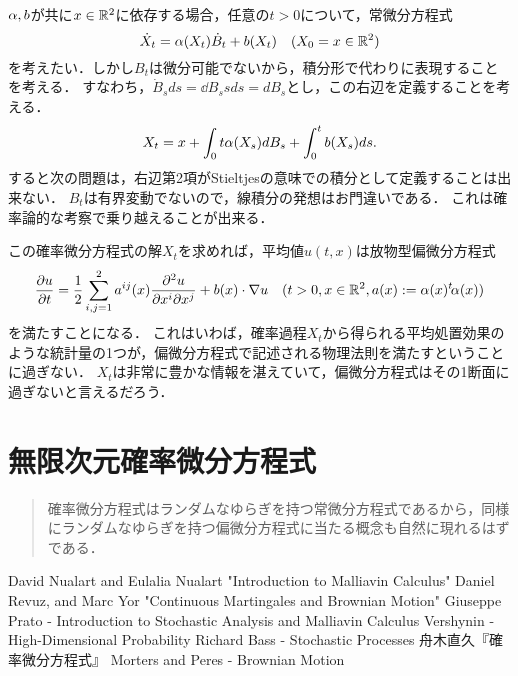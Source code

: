 \documentclass[uplatex,dvipdfmx]{jsreport}
\begin{document}
\begin{example}[変数係数の場合]
    $\alpha,b$が共に$x\in\mathbb{R}^2$に依存する場合，任意の$t>0$について，常微分方程式
    \[\dot{X}_t=\alpha(X_t)\dot{B}_t+b(X_t)\quad(X_0=x\in\mathbb{R}^2)\]
    を考えたい．しかし$B_t$は微分可能でないから，積分形で代わりに表現することを考える．
    すなわち，$\dot{B}_sds=\dd{B_s}{s}ds=dB_s$とし，この右辺を定義することを考える．
    \[X_t=x+\int_0t\alpha(X_s)dB_s+\int^t_0b(X_s)ds.\]
    すると次の問題は，右辺第2項がStieltjesの意味での積分として定義することは出来ない．
    $B_t$は有界変動でないので，線積分の発想はお門違いである．
    これは確率論的な考察で乗り越えることが出来る．

    この確率微分方程式の解$X_t$を求めれば，平均値$u(t,x)$は放物型偏微分方程式
    \[\frac{\partial u}{\partial t}=\frac{1}{2}\sum^2_{i,j=1}a^{ij}(x)\frac{\partial ^2u}{\partial x^i\partial x^j}+b(x)\cdot\nabla u\quad(t>0,x\in\mathbb{R}^2,a(x):=\alpha(x){}^t\!\alpha(x))\]
    を満たすことになる．
    これはいわば，確率過程$X_t$から得られる平均処置効果のような統計量の1つが，偏微分方程式で記述される物理法則を満たすということに過ぎない．
    $X_t$は非常に豊かな情報を湛えていて，偏微分方程式はその1断面に過ぎないと言えるだろう．
\end{example}


\chapter{無限次元確率微分方程式}

\begin{quotation}
    確率微分方程式はランダムなゆらぎを持つ常微分方程式であるから，同様にランダムなゆらぎを持つ偏微分方程式に当たる概念も自然に現れるはずである．
\end{quotation}

\begin{thebibliography}{99}
    David Nualart and Eulalia Nualart "Introduction to Malliavin Calculus"
    Daniel Revuz, and Marc Yor "Continuous Martingales and Brownian Motion"
    Giuseppe Prato - Introduction to Stochastic Analysis and Malliavin Calculus
    Vershynin -  High-Dimensional Probability
    Richard Bass - Stochastic Processes
    舟木直久『確率微分方程式』
    Morters and Peres - Brownian Motion
\end{thebibliography}
\end{document}
